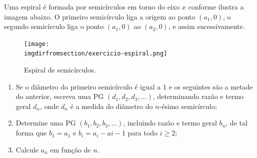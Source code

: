 \begin{exercise}\label{ex:espiral}
    Uma espiral é formada por semicírculos em torno do eixo $x$ conforme ilustra a imagem abaixo. O primeiro semicírculo liga a origem ao ponto $(a_1, 0)$, o segundo semicírculo liga o ponto $(a_1, 0)$ ao $(a_2, 0)$, e assim sucessivamente.
    \begin{figure}[H]
        \centering
        \label{fig:exercicio-espiral}
        \texttt{[image: \\imgdirfromsection/exercicio-espiral.png]}
		\caption{Espiral de semicírculos.}
    \end{figure}
    \begin{enumerate}
        \item Se o diâmetro do primeiro semicírculo é igual a 1 e os seguintes são a metade do anterior, escreva uma PG $(d_1, d_2, d_3 , \dots)$, determinando razão e termo geral $d_n$, onde $d_n$ é a medida do diâmetro do $n$-ésimo semicírculo;
        \item Determine uma PG $(b_1, b_2, b_3 , \dots)$, incluindo razão e termo geral $b_n$, de tal forma que $b_1 = a_1$ e $b_i = a_i - a{i-1}$ para todo $i \geq 2$;
        \item Calcule $a_n$ em função de $n$.
        \end{enumerate}
\end{exercise}



